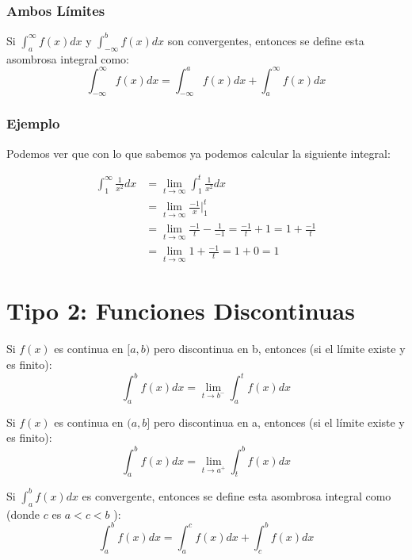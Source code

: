 \documentclass[12pt, fleqn]{report}                             %
\theoremstyle{break}                                            %
\begin{document}
            \subsubsection{Ambos Límites}
            Si $\int_a^{\infty}f(x)dx$ y $\int_{-\infty}^bf(x)dx$ son convergentes, entonces
            se define esta asombrosa integral como:
            \begin{equation}
                \int_{-\infty}^{\infty} f(x) dx = \int_{-\infty}^{a} f(x) dx + \int_{a}^{\infty} f(x) dx   
            \end{equation}

            \subsubsection{Ejemplo}
            Podemos ver que con lo que sabemos ya podemos calcular la siguiente integral:

            \begin{equation*}
            \begin{split}
                \int_1^{\infty} \frac{1}{x^2} dx & = \lim_{t \to \infty} \int_1^t \frac{1}{x^2} dx \\
                & = \lim_{t \to \infty} \frac{-1}{x} \big\rvert_{1}^{t} \\
                & = \lim_{t \to \infty} \frac{-1}{t} - \frac{1}{-1} = \frac{-1}{t} + 1 = 1 + \frac{-1}{t} \\
                & = \lim_{t \to \infty} 1 + \frac{-1}{t} = 1 + 0 = 1
            \end{split}
            \end{equation*}

            \clearpage

        \clearpage
        \section{Tipo 2: Funciones Discontinuas}

            Si $f(x)$ es continua en $[a, b)$  pero discontinua en b, entonces
            (si el límite existe y es finito):
            \begin{equation}
                \int_a^b f(x) dx = \lim_{t \to b^-} \int_a^t f(x) dx
            \end{equation}

            Si $f(x)$ es continua en $(a, b]$  pero discontinua en a, entonces
            (si el límite existe y es finito):
            \begin{equation}
                \int_a^b f(x) dx = \lim_{t \to a^+} \int_t^b f(x) dx
            \end{equation}



            Si $\int_a^bf(x)dx$ es convergente, entonces se define esta asombrosa integral
            como (donde $c$ es $a<c<b$ ):
            \begin{equation}
                \int_a^b f(x) dx = \int_a^c f(x) dx + \int_c^b f(x) dx  
            \end{equation}
\end{document}

